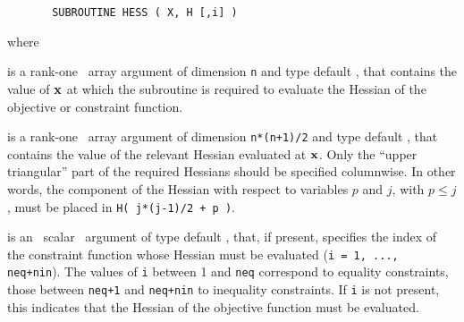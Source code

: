 \documentclass{galahad}
\begin{document}
\def\baselinestretch{0.8}
{\tt \begin{verbatim}
       SUBROUTINE HESS ( X, H [,i] )
\end{verbatim} }
\def\baselinestretch{1.0}
\noindent
where
\begin{description}
 is a rank-one \intentin\ array argument of
dimension {\tt n} and type default \realdp,
that contains the value of ${\mathbf{x}}$ at which the
subroutine is required to evaluate the Hessian
of the objective or constraint function.

 is a rank-one \intentout\ array argument of dimension {\tt n*(n+1)/2}
  and type default \realdp, that contains the value of the relevant
  Hessian evaluated at ${\mathbf{x}}$. Only the ``upper triangular'' part of the
  required Hessians should be specified columnwise. In other words, the
  component of the Hessian with respect to  variables $p$ and $j$, with
  $p \leq j$, must be  placed in {\tt H( j*(j-1)/2 + p )}.

 is an \optional\ scalar \intentin\ argument of type default \integer,
that, if present, specifies the index of the constraint function whose
Hessian must be evaluated  ({\tt i = 1, ..., neq+nin}). The values of {\tt i}
between 1 and {\tt neq} correspond to equality constraints, those between
{\tt neq+1} and {\tt neq+nin} to inequality constraints.
If {\tt i} is not
present, this indicates that the Hessian of the objective function must be
evaluated.
\end{description}

\galerrors\label{serrors}
\end{document}
